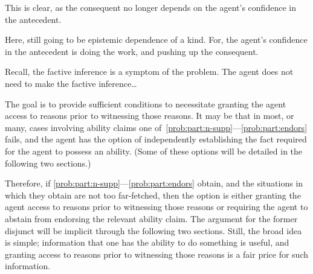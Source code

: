 \documentclass[10pt]{article}
\begin{document}
\begin{note}
  This is clear, as the consequent no longer depends on the agent's confidence in the antecedent.
\end{note}

\begin{note}
  Here, still going to be epistemic dependence of a kind.
  For, the agent's confidence in the antecedent is doing the work, and pushing up the consequent.
\end{note}

Recall, the factive inference is a symptom of the problem.
The agent does not need to make the factive inference\dots

The goal is to provide sufficient conditions to necessitate granting the agent access to reasons prior to witnessing those reasons.
It may be that in most, or many, cases involving ability claims one of~\ref{prob:part:n-supp}---\ref{prob:part:endors} fails, and the agent has the option of independently establishing the fact required for the agent to possess an ability.
(Some of these options will be detailed in the following two sections.)

Therefore, if \ref{prob:part:n-supp}---\ref{prob:part:endors} obtain, and the situations in which they obtain are not too far-fetched, then the option is either granting the agent access to reasons prior to witnessing those reasons or requiring the agent to abstain from endorsing the relevant ability claim.
The argument for the former disjunct will be implicit through the following two sections.
Still, the broad idea is simple; information that one has the ability to do something is useful, and granting access to reasons prior to witnessing those reasons is a fair price for such information.
\end{document}
